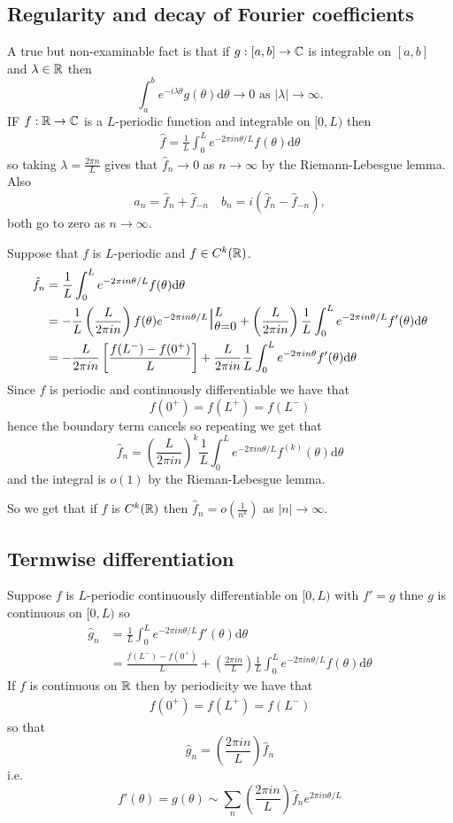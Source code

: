 \documentclass{article}
\begin{document}
\subsection{Regularity and decay of Fourier coefficients}
A true but non-examinable fact is that if $ g:[a,b]\to \mathbb{C} $ is integrable on $ [a,b] $ and $ \lambda\in \mathbb{R} $ then 
\[
	\int_a^be^{-i\lambda\theta}g(\theta)\mathrm d\theta\to 0 \text{ as } |\lambda|\to \infty. 
\]
IF $ f:\mathbb{R}\to \mathbb{C} $ is a $ L $-periodic function and integrable on $ [0,L) $ then
\begin{align*}
	\hat f = \frac 1L\int_0^Le^{-2\pi i n \theta/L}f(\theta)\mathrm d{\theta}
\end{align*}
so taking $ \lambda=\frac{2\pi n}L $ gives that $ \hat f_n\to 0 $ as $ n\to \infty $ by the Riemann-Lebesgue lemma. Also\[
a_n=\hat f_n+\hat f_{-n} \quad b_n=i(\hat f_n -\hat f_{-n}),\] 
both go to zero as $ n\to \infty $.\par
Suppose that $ f $ is $ L $-periodic and $ f\in C^k(\mathbb{R}) $.
\begin{align*}
	\hat f_n&=\frac 1L\int_0^Le^{-2\pi in\theta/L}f(\theta)\mathrm d\theta\\
		&=-\frac 1L\left(\frac{L}{2\pi in}\right)f(\theta)e^{-2\pi in\theta/L}\mathhuge|^L_{\theta=0}+\left(\frac{L}{2\pi in}\right)\frac 1L \int_0^Le^{-2\pi i n \theta/L}f'(\theta)\mathrm d\theta \\
		&= -\frac{L}{2\pi in}\left[\frac{f(L^-)-f(0^+)}L\right]+\frac{L}{2\pi in}\frac 1L\int_0^Le^{-2\pi in \theta}f'(\theta)\mathrm d\theta
\end{align*}
Since $ f $ is periodic and continuously differentiable we have that 
\[
  f(0^+)=f(L^+)=f(L^-)
\]
hence the boundary term cancels so repeating we get that 
\[
	\hat f_n=\left(\frac{L}{2\pi in}\right)^k\frac 1L\int_0^Le^{-2\pi in\theta/L}f^{(k)}(\theta)\mathrm d\theta
\]
and the integral is $ o(1) $ by the Rieman-Lebesgue lemma.\par
So we get that if $ f $ is $ C^k(\mathbb{R}) $ then $ \hat f_n = o\left(\frac 1{n^k}\right) $ as $ |n|\to \infty $.
\subsection{Termwise differentiation}
Suppose $ f $ is $ L $-periodic continuously differentiable on $ [0,L) $ with $ f'=g $ thne $ g $ is continuous on $ [0,L) $ so
\begin{align*}
	\hat g_n&=\frac 1L\int_0^Le^{-2\pi in\theta/L}f'(\theta)\mathrm d\theta\\
		&=\frac{f(L^-)-f(0^+)}L+\left(\frac{2\pi in}{L}\right)\frac 1L\int_0^Le^{-2\pi in\theta/L}f(\theta)\mathrm d\theta
\end{align*}
If $ f $ is continuous on $ \mathbb{R} $ then by periodicity we have that 
\begin{align*}
  f(0^+)=f(L^+)=f(L^-)
\end{align*}
so that 
\[
	\hat g_n=\left(\frac{2\pi in}L\right)\hat f_n
\]
i.e.
\[
	f'(\theta)=g(\theta)\sim \sum_n\left(\frac{2\pi in}L\right)\hat f_ne^{2\pi in\theta/L}
\]
\end{document}
